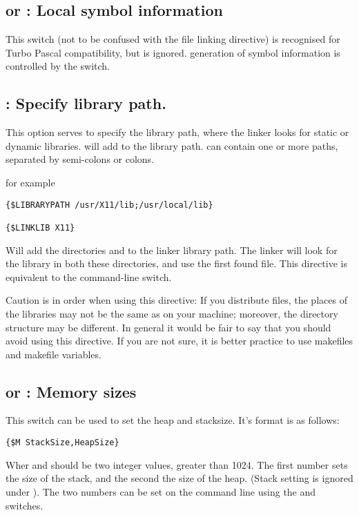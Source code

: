 \documentclass{report}
\begin{document}
\subsection{ or : Local symbol information}

This switch (not to be confused with the  file linking
directive) is recognised for Turbo Pascal compatibility, but is ignored.
generation of symbol information is controlled by the  switch.

\subsection{ : Specify library path.}

This option serves to specify the library path, where the linker looks for
static or dynamic libraries.  will add  
to the library path.  can contain one or more paths, separated 
by semi-colons or colons.

for example
\begin{verbatim}
{$LIBRARYPATH /usr/X11/lib;/usr/local/lib}

{$LINKLIB X11}
\end{verbatim}

Will add the directories  and  to 
the linker library path. The linker will look for the library 
in both these directories, and use the first found file. This directive is 
equivalent to the  command-line switch.

Caution is in order when using this directive: If you distribute files, the 
places of the libraries may not be the same as on your machine; moreover, the
directory structure may be different. In general it would be fair to say
that you should avoid using this directive. If you are not sure, it is better
practice to use makefiles and makefile variables.

\subsection{ or : Memory sizes}

This switch can be used to set the heap and stacksize. It's format is as
follows:
\begin{verbatim}
{$M StackSize,HeapSize}
\end{verbatim}
Wher  and  should be two integer values,
greater than 1024. The first number sets the size of the stack, and the
second the size of the heap. (Stack setting is ignored under \linux).
The two numbers can be set on the command line using the 
and  switches.
\end{document}
